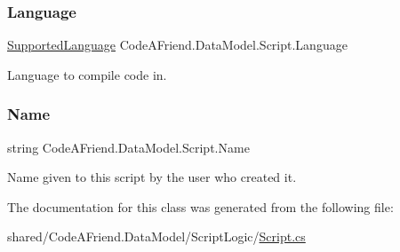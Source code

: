 \mbox{\label{class_code_a_friend_1_1_data_model_1_1_script_a02cc66f28767d1548f3b153d4c2e1840}} 
\subsubsection{\texorpdfstring{Language}{Language}}
{\footnotesize\ttfamily \mbox{\hyperlink{namespace_code_a_friend_1_1_data_model_a13e088c525db1b03a4de75420ced79b2}{Supported\+Language}} Code\+A\+Friend.\+Data\+Model.\+Script.\+Language\hspace{0.3cm}{\ttfamily [get]}}



Language to compile code in.

\mbox{\label{class_code_a_friend_1_1_data_model_1_1_script_aa075f49454db91a785b8147c2b85bb54}} 
\subsubsection{\texorpdfstring{Name}{Name}}
{\footnotesize\ttfamily string Code\+A\+Friend.\+Data\+Model.\+Script.\+Name\hspace{0.3cm}{\ttfamily [get]}}



Name given to this script by the user who created it.



The documentation for this class was generated from the following file\+:\begin{DoxyCompactItemize}
\item 
shared/\+Code\+A\+Friend.\+Data\+Model/\+Script\+Logic/\mbox{\hyperlink{_script_8cs}{Script.\+cs}}\end{DoxyCompactItemize}

